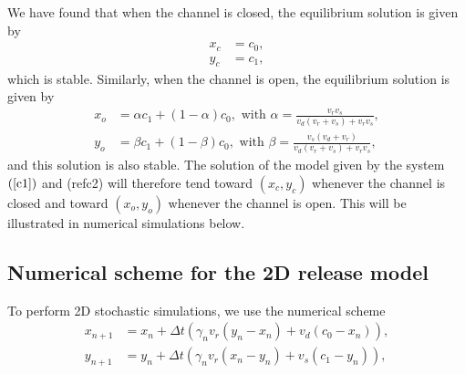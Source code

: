 We have found that when the channel is closed, the equilibrium solution is given
by
\begin{align*}
x_{c} &  =c_{0},\\
y_{c} &  =c_{1},
\end{align*}
which is stable. Similarly, when the channel is open, the equilibrium solution 
is given by
\begin{align*}
x_{o} &  =\alpha c_{1}+\left(  1-\alpha\right)  c_{0},\text{ with }
\alpha=\frac{v_{r}v_{s}}{v_{d}\left(  v_{r}+v_{s}\right)  +v_{r}v_{s}},\\
y_{o} &  =\beta c_{1}+\left(  1-\beta\right)  c_{0},\text{ with }\beta
=\frac{v_{s}\left(  v_{d}+v_{r}\right)  }{v_{d}\left(  v_{r}+v_{s}\right)
+v_{r}v_{s}},
\end{align*}
and this solution is also stable. The solution of the model given by the system $\left(
\ref{c1}\right)$ and (ref{c2}) will therefore tend toward $(x_{c},y_{c})$
whenever the channel is closed and toward  $(x_{o},y_{o})$ whenever the
channel is open. This will be illustrated in numerical simulations below.


\subsection{Numerical scheme for the 2D release model}
\label{numscheme2d}

To perform 2D stochastic simulations, we use the numerical scheme
\begin{align}
x_{n+1}  &  =x_{n}+\Delta t\left(  \gamma_{n}v_{r}\left(  y_{n}-x_{n}\right)
+v_{d}\left(  c_{0}-x_{n}\right)  \right)  ,\label{nc1}\\
y_{n+1}  &  =y_{n}+\Delta t\left(  \gamma_{n}v_{r}\left(  x_{n}-y_{n}\right)
+v_{s}\left(  c_{1}-y_{n}\right)  \right)  , \label{nc2}
\end{align}

